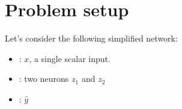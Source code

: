 \documentclass[letterpaper,10pt,english]{jupyterBook}
\begin{document}
\section{Problem setup}
\label{\detokenize{04:problem-setup}}
\sphinxAtStartPar
Let’s consider the following simplified network:
\begin{itemize}
\item {} 
\sphinxAtStartPar
{}: \(x\), a single scalar input.

\item {} 
\sphinxAtStartPar
{}: two neurons \(z_1\) and \(z_2\)

\item {} 
\sphinxAtStartPar
{}: \(\hat{y}\)

\end{itemize}
\end{document}
